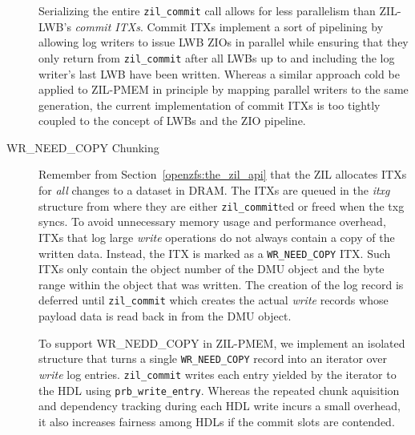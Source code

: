 \documentclass[12pt,a4paper,twoside]{book}
\begin{document}
\begin{description}
        Serializing the entire \lstinline{zil_commit} call allows for less parallelism than ZIL-LWB's \textit{commit ITXs}.
        Commit ITXs implement a sort of pipelining by allowing log writers to issue LWB ZIOs in parallel while ensuring that they only return from \lstinline{zil_commit} after all LWBs up to and including the log writer's last LWB have been written.
        Whereas a similar approach cold be applied to ZIL-PMEM in principle by mapping parallel writers to the same generation, the current implementation of commit ITXs is too tightly coupled to the concept of LWBs and the ZIO pipeline.

    \item[WR\_NEED\_COPY Chunking]
        Remember from Section~\ref{openzfs:the_zil_api} that the ZIL allocates ITXs for \textit{all} changes to a dataset in DRAM.
        The ITXs are queued in the \textit{itxg} structure from where they are either \lstinline{zil_commit}ted or freed when the txg syncs.
        To avoid unnecessary memory usage and performance overhead, ITXs that log large \textit{write} operations do not always contain a copy of the written data.
        Instead, the ITX is marked as a \lstinline{WR_NEED_COPY} ITX.
        Such ITXs only contain the object number of the DMU object and the byte range within the object that was written.
        The creation of the log record is deferred until \lstinline{zil_commit} which creates the actual \textit{write} records whose payload data is read back in from the DMU object.

        To support WR\_NEDD\_COPY in ZIL-PMEM, we implement an isolated structure that turns a single \lstinline{WR_NEED_COPY} record into an iterator over \textit{write} log entries.
        \lstinline{zil_commit} writes each entry yielded by the iterator to the HDL using \lstinline{prb_write_entry}.
        Whereas the repeated chunk aquisition and dependency tracking during each HDL write incurs a small overhead, it also increases fairness among HDLs if the commit slots are contended.

\end{description}
\end{document}
